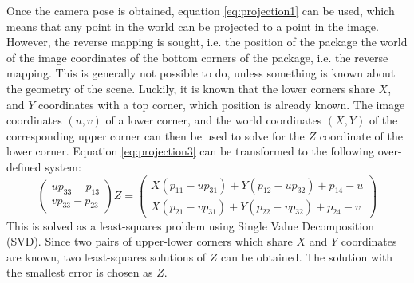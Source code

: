 Once the camera pose is obtained, equation \ref{eq:projection1} can be used, which means that any point in the world can be projected to a point in the image.
However, the reverse mapping is sought, i.e. the position of the package the world of the image coordinates of the bottom corners of the package, i.e. the reverse mapping.
This is generally not possible to do, unless something is known about the geometry of the scene.
Luckily, it is known that the lower corners share $X$, and $Y$ coordinates with a top corner, which position is already known.
The image coordinates $(u,v)$ of a lower corner, and the world coordinates $(X,Y)$ of the corresponding upper corner can then be used to solve for the $Z$ coordinate of the lower corner. 
Equation \ref{eq:projection3} can be transformed to the following over-defined system:
\begin{equation} \label{eq:constrained-projection}
\begin{pmatrix} up_{33}-p_{13} \\ vp_{33}-p_{23} \end{pmatrix} Z = 
\begin{pmatrix}
X(p_{11}-up_{31}) + Y(p_{12}-up_{32})+p_{14}-u \\
X(p_{21}-vp_{31}) + Y(p_{22}-vp_{32})+p_{24}-v
\end{pmatrix}
\end{equation}
This is solved as a least-squares problem using Single Value Decomposition (SVD).
Since two pairs of upper-lower corners which share $X$ and $Y$ coordinates are known, two least-squares solutions of $Z$ can be obtained.
The solution with the smallest error is chosen as $Z$.



